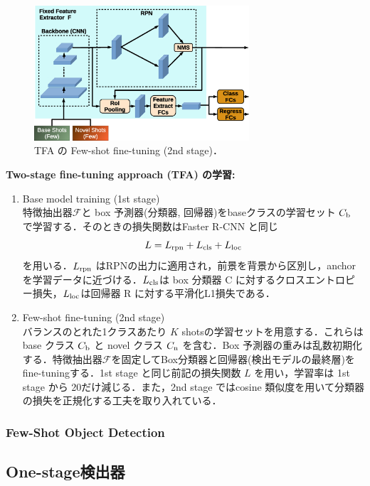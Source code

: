 \documentclass[originalpaper]{jsaiart}     %
\begin{document}
\begin{figure}[tb]
    \begin{center}
        \includegraphics[width=8cm,clip]{fig/archi_TFA.eps}
    \end{center}
    \caption{ TFA の Few-shot fine-tuning (2nd stage)．}
    \label{fig:archi_TFA}
\end{figure}
{\bf Two-stage fine-tuning approach (TFA) の学習:\ } 
\begin{enumerate}
    \item Base model training (1st stage) \\
    特徴抽出器$\mathcal{F}$と box 予測器(分類器, 回帰器)をbaseクラスの学習セット $C_{\rm b}$ で学習する．そのときの損失関数はFaster R-CNN \cite{RHGS15}と同じ $$L=L_{\rm rpn}+L_{\rm cls}+L_{\rm loc}$$を用いる．$L_{\rm rpn}$ はRPNの出力に適用され，前景を背景から区別し，anchorを学習データに近づける．$L_{\rm cls}$は box 分類器 C に対するクロスエントロピー損失，$L_{\rm loc}$は回帰器 R に対する平滑化L1損失である．
    \item Few-shot fine-tuning (2nd stage) \\
    バランスのとれた1クラスあたり $K$ shotsの学習セットを用意する．これらは base クラス $C_{\rm b}$ と novel クラス $C_{\rm n}$ を含む．Box 予測器の重みは乱数初期化する．特徴抽出器$\mathcal{F}$を固定してBox分類器と回帰器(検出モデルの最終層)をfine-tuningする．1st stage と同じ前記の損失関数 $L$ を用い，学習率は 1st stage から 20だけ減じる．また，2nd stage ではcosine 類似度を用いて分類器の損失を正規化する工夫を取り入れている．
\end{enumerate}

\subsubsection{Few-Shot Object Detection}

\subsection{One-stage検出器}
\end{document}

